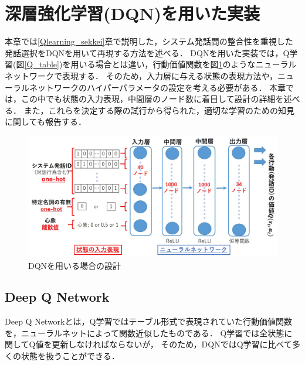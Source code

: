 \documentclass[a4j,dvipdfmx]{jarticle}
\begin{document}

\section{深層強化学習(DQN)を用いた実装}
本章では\ref{Qlearning_sekkei}章で説明した，システム発話間の整合性を重視した発話選択をDQNを用いて再現する方法を述べる．
DQNを用いた実装では，Q学習(図\ref{Q_table})を用いる場合とは違い，行動価値関数を図\ref{input_NN}のようなニューラルネットワークで表現する．
そのため，入力層に与える状態の表現方法や，ニューラルネットワークのハイパーパラメータの設定を考える必要がある．
本章では，この中でも状態の入力表現，中間層のノード数に着目して設計の詳細を述べる．
また，これらを決定する際の試行から得られた，適切な学習のための知見に関しても報告する．

\begin{figure}[tb]
    \centering
    \includegraphics[width=12cm]{input_NN_re2.jpg}
    \caption{DQNを用いる場合の設計}
    \label{input_NN}
\end{figure}

\subsection{Deep Q Network}
Deep Q Networkとは，Q学習ではテーブル形式で表現されていた行動価値関数を，ニューラルネットによって関数近似したものである．
Q学習では全状態に関してQ値を更新しなければならないが，
そのため，DQNではQ学習に比べて多くの状態を扱うことができる．
\end{document}
